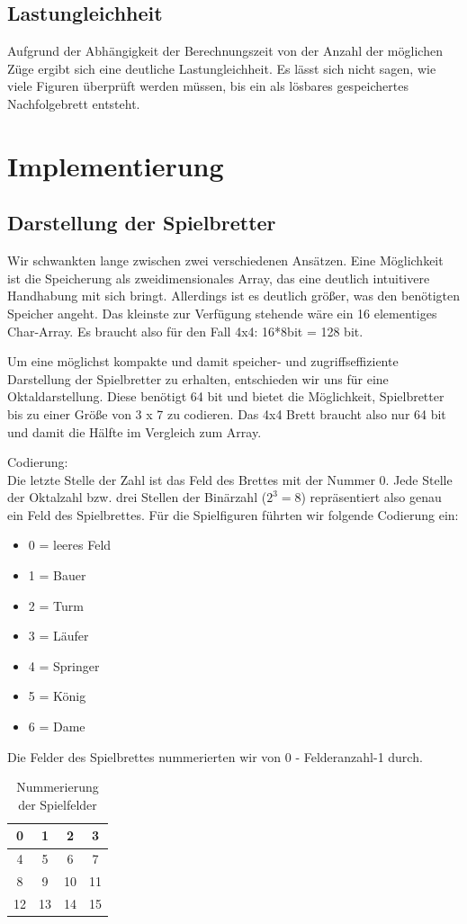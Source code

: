 \documentclass[
	12pt,
	a4paper,
	BCOR10mm,
	DIV14,
	listof=totoc,
	bibliography=totoc,
	headsepline
]{scrreprt}
\begin{document}
\subsection{Lastungleichheit}
Aufgrund der Abhängigkeit der Berechnungszeit von der Anzahl der möglichen Züge ergibt sich eine deutliche Lastungleichheit. Es lässt sich nicht sagen, wie viele Figuren überprüft werden müssen, bis ein als lösbares gespeichertes Nachfolgebrett entsteht. 



\section{Implementierung}
\subsection{Darstellung der Spielbretter}
Wir schwankten lange zwischen zwei verschiedenen Ansätzen.
Eine Möglichkeit ist die Speicherung als zweidimensionales Array, das eine deutlich intuitivere Handhabung mit sich bringt. Allerdings ist es deutlich größer, was den benötigten Speicher angeht.
Das kleinste zur Verfügung stehende wäre ein 16 elementiges Char-Array. 
Es braucht also für den Fall 4x4:  16*8bit = 128 bit.

Um eine möglichst kompakte und damit speicher- und zugriffseffiziente Darstellung der Spielbretter zu erhalten, entschieden wir uns für eine Oktaldarstellung. Diese benötigt 64 bit und bietet die Möglichkeit, Spielbretter bis zu einer Größe von 3 x 7 zu codieren. 
Das 4x4 Brett braucht also nur 64 bit und damit die Hälfte im Vergleich zum Array.

Codierung:\\
Die letzte Stelle der Zahl ist das Feld des Brettes mit der Nummer 0.
Jede Stelle der Oktalzahl bzw. drei Stellen der Binärzahl ($ 2^3 = 8 $) repräsentiert also genau ein Feld des Spielbrettes. Für die Spielfiguren führten wir folgende Codierung ein:
\begin{itemize}
\item 0 = leeres Feld
\item 1 = Bauer
\item 2 = Turm
\item 3 = Läufer
\item 4 = Springer
\item 5 = König
\item 6 = Dame
\end{itemize}

Die Felder des Spielbrettes nummerierten wir von 0 - Felderanzahl-1 durch.
\begin{table}
	\begin{center}
		\begin{tabular}{|c|c|c|c|}\hline
		 0 &  1 &  2 &  3 \\ \hline
		 4 &  5 &  6 &  7 \\ \hline
		 8 &  9 & 10 & 11 \\ \hline
		12 & 13 & 14 & 15  \\ \hline
		\end{tabular}
	\end{center}
	\caption{Nummerierung der Spielfelder}
	\label{table:Tabelle1}
\end{table}
\end{document}
